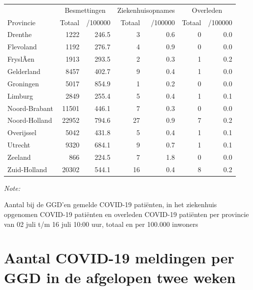 \documentclass[
  english,
  man,floatsintext]{apa6}
\begin{document}
\begin{table}
\centering
\begin{threeparttable}
\begin{tabular}{lrrrrrr}
\toprule
\multicolumn{1}{c}{ } & \multicolumn{2}{c}{Besmettingen} & \multicolumn{2}{c}{Ziekenhuisopnames} & \multicolumn{2}{c}{Overleden} \\
\cmidrule(l{3pt}r{3pt}){2-3} \cmidrule(l{3pt}r{3pt}){4-5} \cmidrule(l{3pt}r{3pt}){6-7}
Provincie & Totaal & /100000 & Totaal & /100000 & Totaal & /100000\\
\midrule
Drenthe & 1222 & 246.5 & 3 & 0.6 & 0 & 0.0\\
Flevoland & 1192 & 276.7 & 4 & 0.9 & 0 & 0.0\\
FryslÃ¢n & 1913 & 293.5 & 2 & 0.3 & 1 & 0.2\\
Gelderland & 8457 & 402.7 & 9 & 0.4 & 1 & 0.0\\
Groningen & 5017 & 854.9 & 1 & 0.2 & 0 & 0.0\\
Limburg & 2849 & 255.4 & 5 & 0.4 & 1 & 0.1\\
Noord-Brabant & 11501 & 446.1 & 7 & 0.3 & 0 & 0.0\\
Noord-Holland & 22952 & 794.6 & 27 & 0.9 & 7 & 0.2\\
Overijssel & 5042 & 431.8 & 5 & 0.4 & 1 & 0.1\\
Utrecht & 9320 & 684.1 & 9 & 0.7 & 1 & 0.1\\
Zeeland & 866 & 224.5 & 7 & 1.8 & 0 & 0.0\\
Zuid-Holland & 20302 & 544.1 & 16 & 0.4 & 8 & 0.2\\
\bottomrule
\end{tabular}
\begin{tablenotes}
\item \textit{Note: } 
\item Aantal bij de GGD’en gemelde COVID-19 patiënten, in het ziekenhuis opgenomen COVID-19 patiënten en overleden COVID-19 patiënten per provincie van 02 juli t/m 16 juli 10:00 uur, totaal en per 100.000 inwoners
\end{tablenotes}
\end{threeparttable}
\end{table}

\newpage

\hypertarget{aantal-covid-19-meldingen-per-ggd-in-de-afgelopen-twee-weken}{%
\section{Aantal COVID-19 meldingen per GGD in de afgelopen twee weken}\label{aantal-covid-19-meldingen-per-ggd-in-de-afgelopen-twee-weken}}
\end{document}
